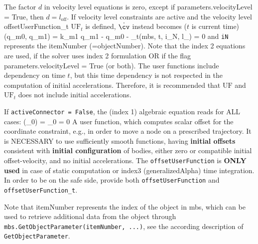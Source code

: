     \ee
    The factor $d$ in velocity level equations is zero, except if parameters.velocityLevel = True, then $d=l_\mathrm{off}$.
    If velocity level constraints are active and the velocity level offsetUserFunction\_t $\mathrm{UF}_t$ is defined, $\dot \cv$ instead becomes ($t$ is current time)
    \be
      \dot \cv(\dot q_{m0}, \dot q_{m1}) = k_{m1} \cdot \dot q_{m1} - \dot q_{m0} - _t(mbs, t, i_N, l_) = 0
    \ee
    and \texttt{iN} represents the itemNumber (=objectNumber).
    Note that the index 2 equations are used, if the solver uses index 2 formulation OR if the flag parameters.velocityLevel = True (or both).
    The user functions include dependency on time $t$, but this time dependency is not respected in the computation of initial accelerations. Therefore,
    it is recommended that $\mathrm{UF}$ and $\mathrm{UF}_t$ does not include initial accelerations.

    If \texttt{activeConnector = False}, the (index 1) algebraic equation reads for ALL cases:
    \be
      \cv(\lambda_0) = \lambda_0 = 0
    \ee
    A user function, which computes scalar offset for the coordinate constraint, e.g., in order to move a node on a prescribed trajectory.
    It is NECESSARY to use sufficiently smooth functions, having {\bf initial offsets} consistent with {\bf initial configuration} of bodies, 
    either zero or compatible initial offset-velocity, and no initial accelerations.
    The \texttt{offsetUserFunction} is {\bf ONLY used} in case of static computation or index3 (generalizedAlpha) time integration.
    In order to be on the safe side, provide both  \texttt{offsetUserFunction} and  \texttt{offsetUserFunction\_t}.

    Note that itemNumber represents the index of the object in mbs, which can be used to retrieve additional data from the object through
    \texttt{mbs.GetObjectParameter(itemNumber, ...)}, see the according description of \texttt{GetObjectParameter}.

